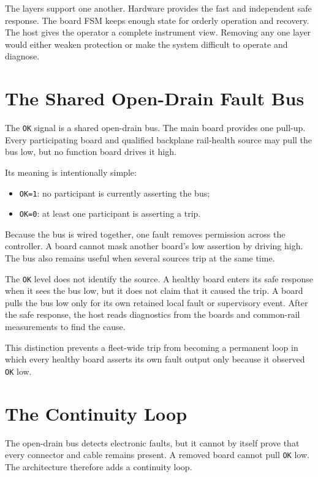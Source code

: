 The layers support one another. Hardware provides the fast and independent safe response. The board FSM keeps enough state for orderly operation and recovery. The host gives the operator a complete instrument view. Removing any one layer would either weaken protection or make the system difficult to operate and diagnose.

\section{The Shared Open-Drain Fault Bus}

The \texttt{OK} signal is a shared open-drain bus. The main board provides one pull-up. Every participating board and qualified backplane rail-health source may pull the bus low, but no function board drives it high.

Its meaning is intentionally simple:

\begin{itemize}
  \item \texttt{OK=1}: no participant is currently asserting the bus;
  \item \texttt{OK=0}: at least one participant is asserting a trip.
\end{itemize}

Because the bus is wired together, one fault removes permission across the controller. A board cannot mask another board's low assertion by driving high. The bus also remains useful when several sources trip at the same time.

The \texttt{OK} level does not identify the source. A healthy board enters its safe response when it sees the bus low, but it does not claim that it caused the trip. A board pulls the bus low only for its own retained local fault or supervisory event. After the safe response, the host reads diagnostics from the boards and common-rail measurements to find the cause.

This distinction prevents a fleet-wide trip from becoming a permanent loop in which every healthy board asserts its own fault output only because it observed \texttt{OK} low.

\section{The Continuity Loop}

The open-drain bus detects electronic faults, but it cannot by itself prove that every connector and cable remains present. A removed board cannot pull \texttt{OK} low. The architecture therefore adds a continuity loop.

